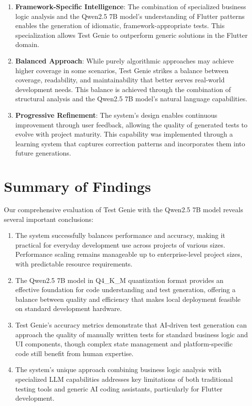 \begin{enumerate}
    \item \textbf{Framework-Specific Intelligence}: The combination of specialized business logic analysis and the Qwen2.5 7B model's understanding of Flutter patterns enables the generation of idiomatic, framework-appropriate tests. This specialization allows Test Genie to outperform generic solutions in the Flutter domain.
    
    \item \textbf{Balanced Approach}: While purely algorithmic approaches may achieve higher coverage in some scenarios, Test Genie strikes a balance between coverage, readability, and maintainability that better serves real-world development needs. This balance is achieved through the combination of structural analysis and the Qwen2.5 7B model's natural language capabilities.
    
    \item \textbf{Progressive Refinement}: The system's design enables continuous improvement through user feedback, allowing the quality of generated tests to evolve with project maturity. This capability was implemented through a learning system that captures correction patterns and incorporates them into future generations.
\end{enumerate}

\section{Summary of Findings}

Our comprehensive evaluation of Test Genie with the Qwen2.5 7B model reveals several important conclusions:

\begin{enumerate}
    \item The system successfully balances performance and accuracy, making it practical for everyday development use across projects of various sizes. Performance scaling remains manageable up to enterprise-level project sizes, with predictable resource requirements.
    
    \item The Qwen2.5 7B model in Q4\_K\_M quantization format provides an effective foundation for code understanding and test generation, offering a balance between quality and efficiency that makes local deployment feasible on standard development hardware.
    
    \item Test Genie's accuracy metrics demonstrate that AI-driven test generation can approach the quality of manually written tests for standard business logic and UI components, though complex state management and platform-specific code still benefit from human expertise.
    
    \item The system's unique approach combining business logic analysis with specialized LLM capabilities addresses key limitations of both traditional testing tools and generic AI coding assistants, particularly for Flutter development.
\end{enumerate}

